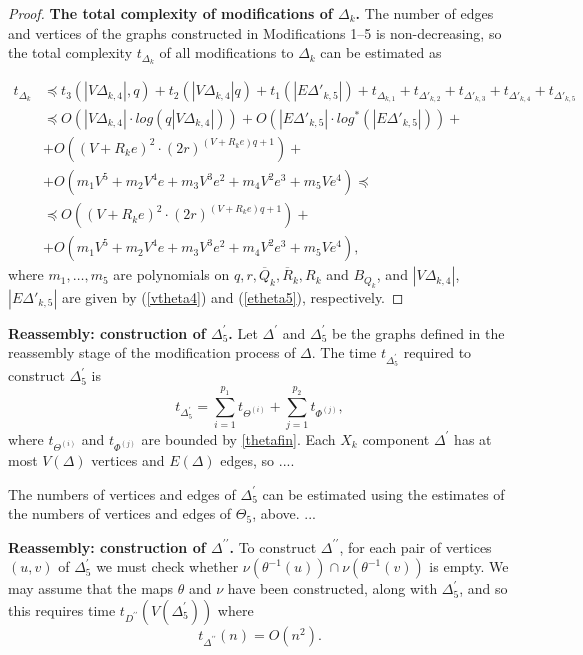 \documentclass[a4paper,12pt]{article}
\newcommand{\D}{\Delta }
\numberwithin{equation}{section}
\numberwithin{figure}{section}
\begin{document}
\begin{proof}
{\bf The total complexity of modifications of $\D_k$.} The number of
edges and vertices of the graphs constructed in Modifications 1--5 is non-decreasing, so the
total complexity $t_{\D_k}$ of all modifications to $\D_k$ can be estimated as

\begin{equation}\label{thetafin}
\begin{split}
t_{\D_k} &\preceq t_3(|V \D_{k,4}|, q) + t_2(|V \D_{k,4}| q )+
t_1(|E\D'_{k,5}|)+t_{\D_{k,1}} + t_{\D'_{k,2}}+t_{\D'_{k,3}}+t_{\D'_{k,4}}+t_{\D'_{k,5}}\\
&\preceq O(|V \D_{k,4}|\cdot log(q |V \D_{k,4}|))+O (|E\D'_{k,5}| \cdot log^{\ast}(|E\D'_{k,5}|))+\\
&+O((V +R_k e)^2\cdot (2r)^{(V + R_k e) q +1})+\\
&+O(m_1 V^5 + m_2V^4 e +m_3 V^3 e^2 +m_4 V^2 e^3 + m_5 V e^4)\preceq\\
&\preceq O((V +R_k e)^2\cdot (2r)^{(V + R_k e) q +1})+ \\
&+O(m_1 V^5 + m_2V^4 e +m_3 V^3 e^2 +m_4 V^2 e^3 + m_5 V e^4),
\end{split}
\end{equation}
where $m_1, \ldots, m_5$ are polynomials on  $q, r,
\overline{Q}_k, \overline{R}_k, R_k$ and $B_{Q_k}$, and $|V
\D_{k,4}|$, $|E\D'_{k,5}|$ are given by (\ref{vtheta4}) and
(\ref{etheta5}), respectively.

\end{proof}

{\bf Reassembly: construction of $\D^\prime_5$.}
Let $\D^\prime$ and $\D^\prime_5$ be the graphs defined in the
reassembly stage of the modification process of $\D$.
The time  $t_{\D^\prime_5}$ required to  construct $\D^{\prime}_5$
is %
\begin{equation}\label{eq:D'}
t_{\D^\prime_5}=\sum_{i=1}^{p_1} t_{\Theta^{(i)}}+
\sum_{j=1}^{p_2} t_{\Phi^{(j)}},
\end{equation}
where  $t_{\Theta^{(i)}}$ and $t_{\Phi^{(j)}}$ are bounded by \eqref{thetafin}.
Each $X_k$ component $\D^\prime$ has at most $V(\D)$ vertices
and $E(\D)$ edges, so ....


The numbers of vertices and edges of $\D_5^\prime$ can be estimated
using the estimates of the numbers of vertices and edges of $\Theta_5$, above.
...

{\bf Reassembly: construction of $\D^{\prime\prime}$.}
To construct $\D^{\prime\prime}$,
for each
pair of vertices $(u,v)$ of $\D^\prime_5$ we must check whether
$\nu(\theta^{-1}(u))\cap\nu(\theta^{-1}(v))$ is empty. We may assume that
the maps $\theta$ and $\nu$ have been constructed, along with $\D^\prime_5$,
and so this requires time $t_{D^{\prime\prime}}(V(\D^\prime_5))$ where
\begin{equation}\label{eq:D''}
t_{\D^{\prime\prime}}(n)=O(n^2).
\end{equation}
\end{document}
